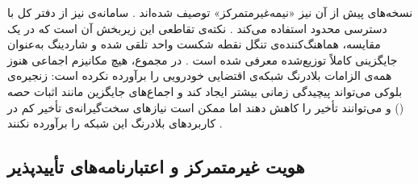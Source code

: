 نسخه‌های پیش از آن نیز «نیمه‌غیرمتمرکز» توصیف شده‌اند \cite{silvanoIotaTangleCryptocurrency2020}. سامانه‌ی  نیز از دفتر کل  با دسترسی محدود استفاده می‌کند \cite{feraudoDIVADIDbasedReputation2024}. نکته‌ی تقاطعی این زیربخش آن است که در یک مقایسه، هماهنگ‌کننده‌ی تنگل نقطه شکست واحد تلقی شده و شاردینگ به‌عنوان جایگزینی کاملاً توزیع‌شده معرفی شده است \cite{ghovanlooyghajarSBTMSScalableBlockchain2021}. در مجموع، هیچ مکانیزم اجماعی هنوز همه‌ی الزامات بلادرنگ شبکه‌ی اقتضایی خودرویی را برآورده نکرده است: زنجیره‌ی بلوکی می‌تواند پیچیدگی زمانی بیشتر ایجاد کند \cite{farsimadanReviewSecurityChallenges2025} و اجماع‌های جایگزین مانند اثبات حصه () و  می‌توانند تأخیر را کاهش دهند اما ممکن است نیازهای سخت‌گیرانه‌ی تأخیر کم در کاربردهای بلادرنگ این شبکه را برآورده نکنند \cite{razaBlockchainBasedReputationTrust2024}.

\subsection{هویت غیرمتمرکز و اعتبارنامه‌های تأییدپذیر}

